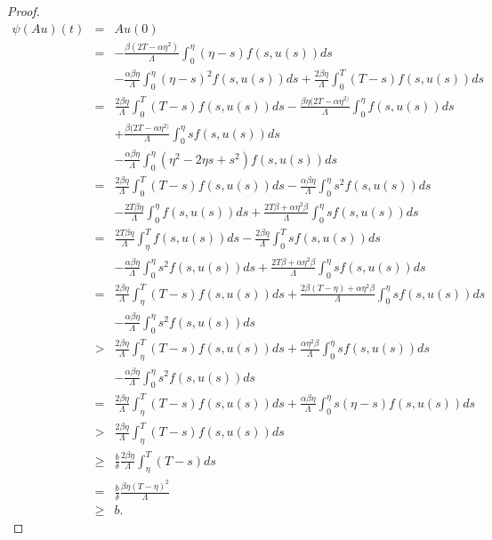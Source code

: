 \documentclass[reqno]{amsart}\usepackage{amsmath}
\begin{document}
\begin{proof}
\begin{eqnarray*}
\psi(Au)(t)&=& Au(0)\\
&=&-\frac{\beta (2T-\alpha \eta ^{2})}{\Lambda}\int_{0}^{\eta }(\eta -s)f(s, u(s))ds\\
&&-\frac{\alpha \beta \eta }{\Lambda}\int_{0}^{\eta }(\eta -s)^{2}f(s, u(s))ds +\frac{2\beta \eta }{\Lambda}\int_{0}^{T}(T-s)f(s, u(s))ds \\
&=&\frac{2\beta\eta}{\Lambda}\int_{0}^{T}(T-s)f(s, u(s))ds-\frac{\beta\eta(2T-\alpha\eta^{2)} }{\Lambda}\int_{0}^{\eta }f(s, u(s))ds \\
&&+\frac{\beta(2T-\alpha\eta^{2)}}{\Lambda}\int_{0}^{\eta}sf(s, u(s))ds\\
&&-\frac{\alpha\beta\eta }{\Lambda}\int_{0}^{\eta}(\eta^{2}-2\eta s+s^{2})f(s, u(s))ds\\
&=&\frac{2\beta\eta}{\Lambda}\int_{0}^{T}(T-s)f(s, u(s))ds-\frac{\alpha\beta\eta}{\Lambda}\int_{0}^{\eta }s^{2}f(s, u(s))ds \\
&&-\frac{2T\beta\eta}{\Lambda}\int_{0}^{\eta}f(s, u(s))ds +\frac{2T\beta+\alpha\eta^{2}\beta}{\Lambda}\int_{0}^{\eta}sf(s, u(s))ds \\
&=&\frac{2T\beta\eta}{\Lambda}\int_{\eta}^{T}f(s, u(s))ds-\frac{2\beta\eta}{\Lambda}\int_{0}^{T }sf(s, u(s))ds \\
&&-\frac{\alpha\beta\eta}{\Lambda}\int_{0}^{\eta}s^{2}f(s, u(s))ds +\frac{2T\beta+\alpha\eta^{2}\beta}{\Lambda}\int_{0}^{\eta}sf(s, u(s))ds \\
&=&\frac{2\beta\eta}{\Lambda}\int_{\eta}^{T}(T-s)f(s, u(s))ds+\frac{2\beta(T-\eta)+\alpha\eta^{2}\beta}{\Lambda}\int_{0}^{\eta }sf(s, u(s))ds \\
&&-\frac{\alpha\beta\eta}{\Lambda}\int_{0}^{\eta}s^{2}f(s, u(s))ds\\
&>& \frac{2\beta\eta}{\Lambda}\int_{\eta}^{T}(T-s)f(s, u(s))ds+\frac{\alpha\eta^{2}\beta}{\Lambda}\int_{0}^{\eta}sf(s, u(s))ds \\
&&-\frac{\alpha\beta\eta}{\Lambda}\int_{0}^{\eta}s^{2}f(s, u(s))ds\\
&=& \frac{2\beta\eta}{\Lambda}\int_{\eta}^{T}(T-s)f(s, u(s))ds+\frac{\alpha\beta\eta}{\Lambda}\int_{0}^{\eta}s(\eta-s)f(s, u(s))ds\\
&>& \frac{2\beta\eta}{\Lambda}\int_{\eta}^{T}(T-s)f(s, u(s))ds\\
&\geq& \frac{b}{\delta}\frac{2\beta\eta}{\Lambda}\int_{\eta}^{T}(T-s)ds\\
&=& \frac{b}{\delta}\frac{\beta\eta(T-\eta)^{2}}{\Lambda}\\
&\geq& b.
\end{eqnarray*}


\end{proof}
\end{document}
